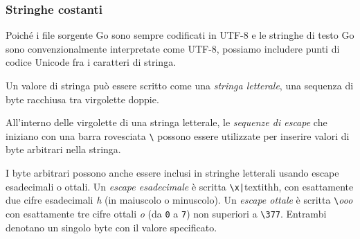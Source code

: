 \documentclass[../../../thesis.tex]{subfiles}
\begin{document}
    \subsubsection{Stringhe costanti}
    Poiché i file sorgente Go sono sempre codificati in UTF-8 e le stringhe di testo Go sono convenzionalmente interpretate come UTF-8, possiamo includere punti di codice Unicode fra i caratteri di stringa.
    \hfill \vspace{12pt}

    Un valore di stringa può essere scritto come una \textit{stringa letterale}, una sequenza di byte racchiusa tra virgolette doppie.\hfill \vspace{12pt}
    \hfill \vspace{12pt}

    All'interno delle virgolette di una stringa letterale, le \textit{sequenze di escape} che iniziano con una barra rovesciata \verb"\" possono essere utilizzate per inserire valori di byte arbitrari nella stringa.
    \hfill \vspace{12pt}

    I byte arbitrari possono anche essere inclusi in stringhe letterali usando escape esadecimali o ottali.
    Un \textit{escape esadecimale} è scritta \verb"\x|"textit{hh}, con esattamente due cifre esadecimali \textit{h} (in maiuscolo o minuscolo).
    Un \textit{escape ottale} è scritta \verb"\"\textit{ooo} con esattamente tre cifre ottali \textit{o} (da \verb"0" a \verb"7") non superiori a \verb"\377".
    Entrambi denotano un singolo byte con il valore specificato.
\end{document}
